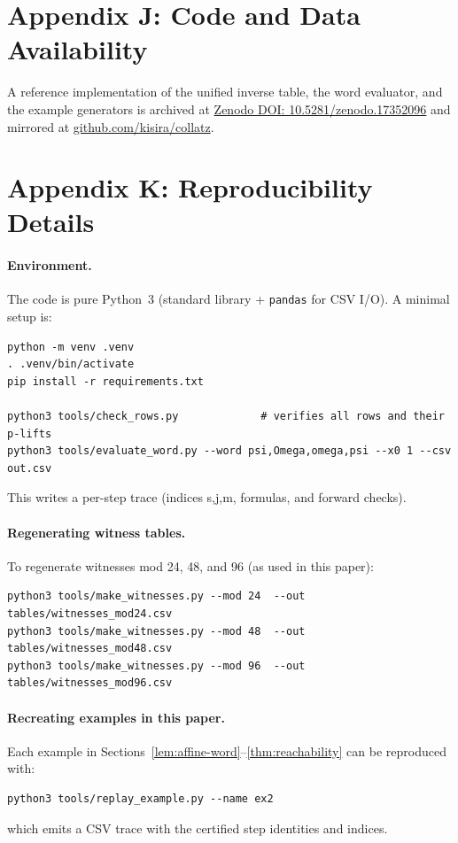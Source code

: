 \documentclass[11pt,letterpaper]{amsart}
\def\({}%
\def\){}%
\theoremstyle{definition}
\theoremstyle{plain}
\theoremstyle{plain}
\theoremstyle{remark}
\begin{document}
\section*{Appendix J: Code and Data Availability}
A reference implementation of the unified inverse table, the word evaluator, and the example generators is archived at
\href{https://doi.org/10.5281/zenodo.17352096}{Zenodo DOI: 10.5281/zenodo.17352096} and mirrored at
\href{git@github.com:kisira/collatz.git}{github.com/kisira/collatz}.


\section*{Appendix K: Reproducibility Details}\label{app:repro}

\paragraph{Environment.}
The code is pure Python~3 (standard library + \texttt{pandas} for CSV I/O). A minimal setup is:
\begin{lstlisting}[basicstyle=\ttfamily\small,breaklines=true]
python -m venv .venv
. .venv/bin/activate
pip install -r requirements.txt

python3 tools/check_rows.py             # verifies all rows and their p-lifts
python3 tools/evaluate_word.py --word psi,Omega,omega,psi --x0 1 --csv out.csv
\end{lstlisting}

This writes a per-step trace (indices \(s,j,m\), formulas, and forward checks).

\paragraph{Regenerating witness tables.}
To regenerate witnesses mod \(24\), \(48\), and \(96\) (as used in this paper):
\begin{verbatim}
python3 tools/make_witnesses.py --mod 24  --out tables/witnesses_mod24.csv
python3 tools/make_witnesses.py --mod 48  --out tables/witnesses_mod48.csv
python3 tools/make_witnesses.py --mod 96  --out tables/witnesses_mod96.csv
\end{verbatim}

\paragraph{Recreating examples in this paper.}
Each example in Sections~\ref{lem:affine-word}–\ref{thm:reachability} can be reproduced with:
\begin{verbatim}
python3 tools/replay_example.py --name ex2
\end{verbatim}
which emits a CSV trace with the certified step identities and indices.
\end{document}
